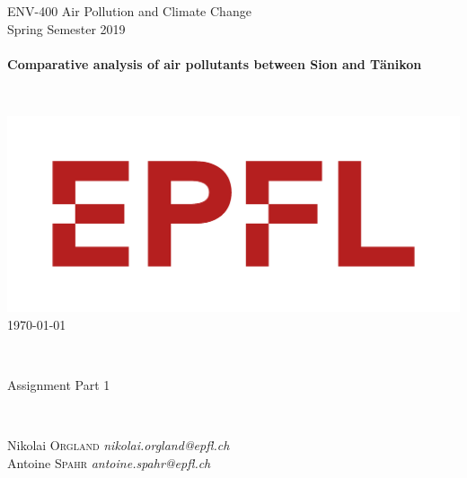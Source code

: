 \documentclass[a4paper, 12pt]{article}
\begin{document}
\thispagestyle{empty}
\begin{center}
    {\large ENV-400 Air Pollution and Climate Change}\\[0.2cm]
    
    {\normalsize Spring Semester 2019 }\\[1.2cm]
    
    \hrulefill 
    \\[0.5cm]
        {\Huge\textbf{Comparative analysis of air pollutants between Sion and Tänikon}}
    \\[0.5cm]
    \hrulefill 	
\end{center}

~\\[1.3cm]

\begin{center}
    \includegraphics[scale=0.20]{Logo_EPFL.png}\\[1.5cm]
    {\large \today}\\[0.5cm]
\end{center}

~\\[2.3cm]

\begin{centering}
    \large
    Assignment Part 1 \\
\end{centering}

~\\[1.3cm]

\begin{centering}
    \large
    Nikolai \textsc{Orgland} \textit{\small nikolai.orgland@epfl.ch}\\ 
    Antoine \textsc{Spahr} \textit{\small antoine.spahr@epfl.ch}\\
\end{centering}

\vfill
\thispagestyle{empty} 
\end{document}

